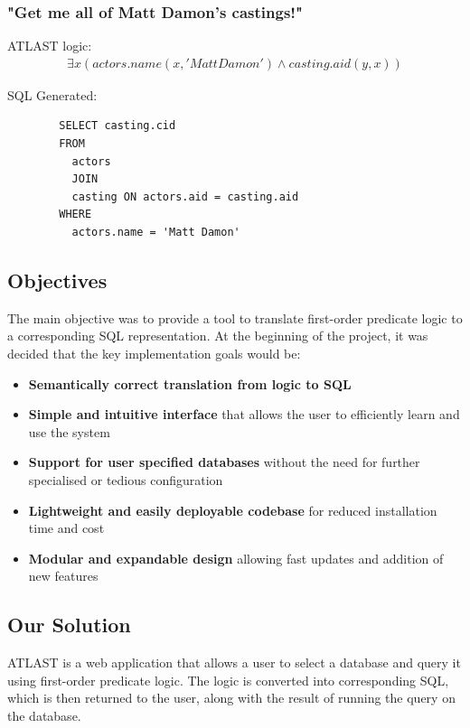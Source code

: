 \documentclass[a4paper, 11pt]{article}
\begin{document}
    \subsubsection*{"Get me all of Matt Damon's castings!"}
      
      ATLAST logic:
      \begin{gather}
        \exists x(actors.name(x, 'Matt Damon') \land casting.aid(y, x))
      \end{gather}

      SQL Generated:
      \begin{verbatim}
        SELECT casting.cid
        FROM 
          actors
          JOIN
          casting ON actors.aid = casting.aid
        WHERE
          actors.name = 'Matt Damon'
      \end{verbatim}

  \subsection{Objectives}
    The main objective was to provide a tool to translate first-order predicate
    logic to a corresponding SQL representation. At the beginning of the
    project, it was decided that the key implementation goals would be:

    \begin{itemize}
      \item \textbf{Semantically correct translation from logic to SQL}

      \item \textbf{Simple and intuitive interface} that allows the user to
      efficiently learn and use the system

      \item \textbf{Support for user specified databases} without the need for
      further specialised or tedious configuration

      \item \textbf{Lightweight and easily deployable codebase} for reduced
      installation time and cost

      \item \textbf{Modular and expandable design} allowing fast updates and
      addition of new features
    \end{itemize}

  \subsection{Our Solution}
    ATLAST is a web application that allows a user to select a database
    and query it using first-order predicate logic. The logic is converted
    into corresponding SQL, which is then returned to the user, along with the
    result of running the query on the database.
\end{document}
